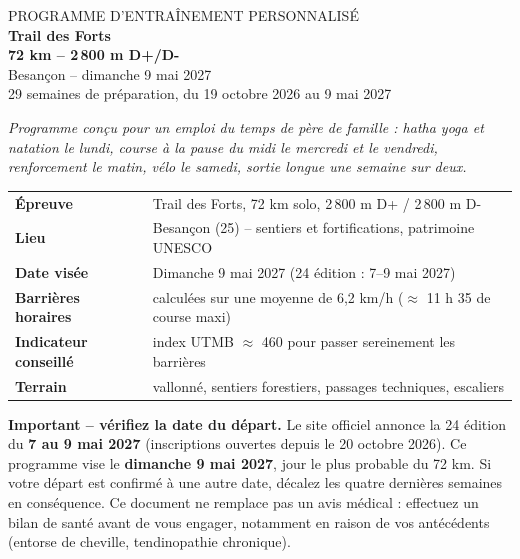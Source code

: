 \documentclass[10pt,a4paper]{article}
\begin{document}
\thispagestyle{empty}
\begin{center}
\vspace*{1.2cm}
{\sffamily\color{grey1}\large PROGRAMME D'ENTRA\^INEMENT PERSONNALIS\'E}\\[14pt]
{\sffamily\bfseries\color{acc}\Huge Trail des Forts}\\[6pt]
{\sffamily\bfseries\color{acc}\LARGE 72 km -- 2\,800 m D+/D-}\\[12pt]
{\sffamily\large Besan\c{c}on -- dimanche 9 mai 2027}\\[20pt]
{\sffamily\large 29 semaines de pr\'eparation, du 19 octobre 2026 au 9 mai 2027}\\[24pt]
\begin{minipage}{0.82\textwidth}\centering\itshape\small
Programme con\c{c}u pour un emploi du temps de p\`ere de famille :
hatha yoga et natation le lundi, course \`a la pause du midi le mercredi
et le vendredi, renforcement le matin, v\'elo le samedi, sortie longue
une semaine sur deux.
\end{minipage}
\end{center}

\vspace{1.1cm}
\begin{center}
\begin{tabular}{ll}
\toprule
\textbf{\'Epreuve} & Trail des Forts, 72 km solo, 2\,800 m D+ / 2\,800 m D- \\
\textbf{Lieu} & Besan\c{c}on (25) -- sentiers et fortifications, patrimoine UNESCO \\
\textbf{Date vis\'ee} & Dimanche 9 mai 2027 (24\up{e} \'edition : 7--9 mai 2027) \\
\textbf{Barri\`eres horaires} & calcul\'ees sur une moyenne de 6,2 km/h ($\approx$ 11 h 35 de course maxi) \\
\textbf{Indicateur conseill\'e} & index UTMB $\approx$ 460 pour passer sereinement les barri\`eres \\
\textbf{Terrain} & vallonn\'e, sentiers forestiers, passages techniques, escaliers \\
\bottomrule
\end{tabular}
\end{center}

\vspace{0.9cm}
\begin{aret}
\textbf{Important -- v\'erifiez la date du d\'epart.} Le site officiel annonce la 24 \'edition du \textbf{7 au 9 mai 2027} (inscriptions ouvertes depuis le 20 octobre 2026). Ce programme vise le \textbf{dimanche 9 mai 2027}, jour le plus probable du 72 km. Si votre d\'epart est confirm\'e \`a une autre date, d\'ecalez les quatre derni\`eres semaines en cons\'equence. Ce document ne remplace pas un avis m\'edical : effectuez un bilan de sant\'e avant de vous engager, notamment en raison de vos ant\'ec\'edents (entorse de cheville, tendinopathie chronique).
\end{aret}
\end{document}
